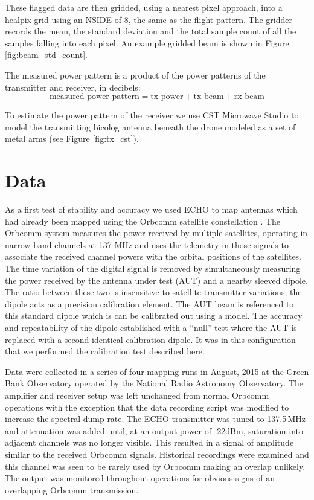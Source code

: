 \documentclass[preprint2,numberedappendix,tighten,twocolappendix]{aastex6}
\begin{document}
These flagged data are then gridded, using a nearest pixel approach, into a healpix grid using an NSIDE of 8, the same as the flight pattern.  The gridder records the mean, the standard deviation and the total sample count of all the samples falling into each pixel. An example gridded beam is shown in Figure \ref{fig:beam_std_count}.

The measured power pattern is a product of the power patterns of the transmitter and receiver, in decibels:
\begin{equation}
\textrm{measured power pattern} = \textrm{tx power} + \textrm{tx beam} + \textrm{rx beam}
\end{equation}

  To estimate the power pattern of the receiver we use CST Microwave Studio to model the transmitting bicolog antenna beneath the drone modeled as a set of metal arms (see Figure \ref{fig:tx_cst}).  




\section{Data}
As a first test of stability and accuracy we used ECHO to map antennas which had already been mapped using the Orbcomm satellite constellation .  The Orbcomm system measures the power received by multiple satellites, operating in narrow band channels at 137 MHz and uses the telemetry in those signals to associate the received channel powers with the orbital positions of the satellites.   The time variation of the digital signal is removed by simultaneously measuring the power received by the antenna under test (AUT) and a nearby sleeved dipole. The ratio between these two is insensitive to satellite transmitter variations; the dipole acts as a precision calibration element. The AUT beam is referenced to this standard dipole which is can be calibrated out using a model.  The accuracy and repeatability of the dipole established with a ``null'' test where the AUT is replaced with a second identical calibration dipole.  It was in this configuration that we performed the calibration test described here.


Data were collected in a series of four mapping runs in August, 2015 at the Green Bank Observatory operated by the National Radio Astronomy Observatory.  The amplifier and receiver setup was left unchanged from normal Orbcomm operations with the exception that the data recording script was modified to increase the spectral dump rate. The ECHO transmitter was tuned to 137.5\,MHz and attenuation was added until, at an output power of -22dBm, saturation into adjacent channels was no longer visible.  This resulted in a signal of amplitude similar to the received Orbcomm signals. Historical recordings were examined and this channel was seen to be rarely used by Orbcomm making an overlap unlikely.  The output was monitored throughout operations for obvious signs of an overlapping Orbcomm transmission.
\end{document}
